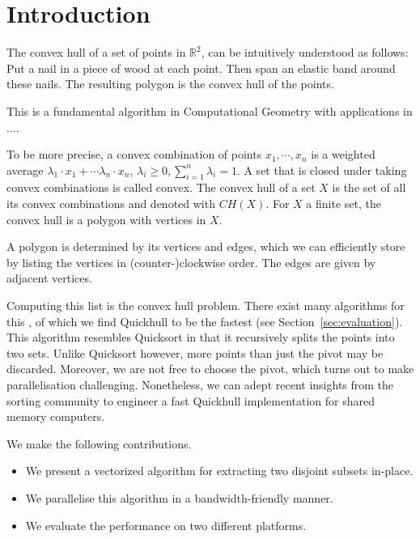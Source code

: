 \section{Introduction}

The convex hull of a set of points in $\mathbb{R}^2$, can be intuitively 
understood as follows: Put a nail in a piece of wood at each point. Then span 
an elastic band around these nails. The resulting polygon is the convex hull of 
the points.

This is a fundamental algorithm in Computational Geometry with applications
in .... 

To be more precise, a convex combination of points $x_1, \cdots, x_n$ is a 
weighted average $\lambda_1 \cdot x_1 + \cdots \lambda_n \cdot x_n$, 
$\lambda_i \geq 0, \sum_{i = 1}^n \lambda_i = 1$. A set that is closed under
taking convex combinations is called convex. The convex hull of a set $X$ is
the set of all its convex combinations and denoted with $CH(X)$. For $X$
a finite set, the convex hull is a polygon with vertices in $X$.

A polygon is determined by its vertices and edges, which we can efficiently
store by listing the vertices in (counter-)clockwise order. The edges are given 
by adjacent vertices.

Computing this list is the convex hull problem. There exist many algorithms for 
this \cite{}, of which we find Quickhull to be the fastest (see
Section~\ref{sec:evaluation}). This algorithm resembles Quicksort in that
it recursively splits the points into two sets. Unlike Quicksort however,
more points than just the pivot may be discarded. Moreover, we are not
free to choose the pivot, which turns out to make parallelisation challenging.
Nonetheless, we can adept recent insights from the sorting community to engineer
a fast Quickhull implementation for shared memory computers.

We make the following contributions.

\begin{itemize}
    \item We present a vectorized algorithm for extracting two disjoint
          subsets in-place.
    \item We parallelise this algorithm in a bandwidth-friendly manner.
    \item We evaluate the performance on two different platforms. 
\end{itemize}
